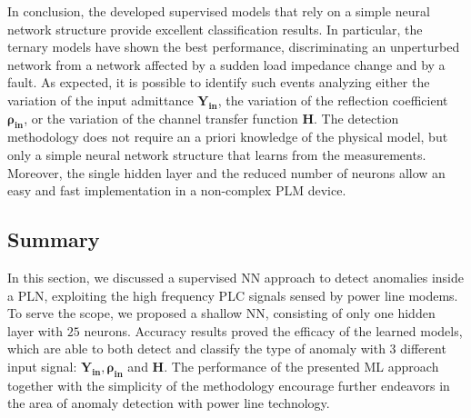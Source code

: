 In conclusion, the developed supervised models that rely on a simple neural network structure provide excellent classification results. In particular, the ternary models have shown the best performance, discriminating an unperturbed network from a network affected by a sudden load impedance change and by a fault. As expected, it is possible to identify such events analyzing either the variation of the input admittance $\mathbf{Y_{\text{in}}}$, the variation of the reflection coefficient $\mathbf{\rho_{\text{in}}}$, or the variation of the channel transfer function $\mathbf{H}$. The detection methodology does not require an a priori knowledge of the physical model, but only a simple neural network structure that learns from the measurements. Moreover, the single hidden layer and the reduced number of neurons allow an easy and fast implementation in a non-complex PLM device. 

\subsection{Summary}
\label{subsec:plc_anomaly_conclusions}
In this section, we discussed a supervised NN approach to detect anomalies inside a PLN, exploiting the high frequency PLC signals sensed by power line modems.
To serve the scope, we proposed a shallow NN, consisting of only one hidden layer with $25$ neurons. Accuracy results proved the efficacy of the learned models, which are able to both detect and classify the type of anomaly with $3$ different input signal: $\mathbf{Y_{\text{in}}}, \mathbf{\rho_{\text{in}}}$ and $\mathbf{H}$. The performance of the presented ML approach together with the simplicity of the methodology encourage further endeavors in the area of anomaly detection with power line technology. 